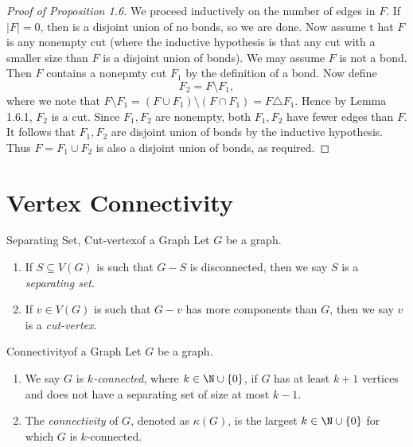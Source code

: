 \documentclass[co342]{subfiles}
\begin{document}
    \begin{proof}[Proof of Proposition 1.6]
        We proceed inductively on the number of edges in $F$. If $\left| F \right| = 0$, then is a disjoint union of no bonds, so we are done. Now assume t hat $F$ is any nonempty cut (where the inductive hypothesis is that any cut with a smaller size than $F$ is a disjoint union of bonds). We may assume $F$ is not a bond. Then $F$ contains a nonepmty cut $F_1$ by the definition of a bond. Now define
        \begin{equation*}
            F_2 = F\setminus F_1,
        \end{equation*}
        where we note that $F\setminus F_1 = \left( F\cup F_1 \right) \setminus \left( F\cap F_1 \right) = F\triangle F_1$. Hence by Lemma 1.6.1, $F_2$ is a cut. Since $F_1,F_2$ are nonempty, both $F_1,F_2$ have fewer edges than $F$. It follows that $F_1,F_2$ are disjoint union of bonds by the inductive hypothesis. Thus $F=F_1\cup F_2$ is also a disjoint union of bonds, as required.
    \end{proof}

    \section{Vertex Connectivity}
    
    \begin{definition}{Separating Set, Cut-vertex}{of a Graph}
        Let $G$ be a graph.
        \begin{enumerate}
            \item If $S\subseteq V\left( G \right)$ is such that $G-S$ is disconnected, then we say $S$ is a \emph{separating set}.
            \item If $v\in V\left( G \right)$ is such that $G-v$ has more components than $G$, then we say $v$ is a \emph{cut-vertex}.
        \end{enumerate}
    \end{definition}

    \begin{definition}{Connectivity}{of a Graph}
        Let $G$ be a graph. 
        \begin{enumerate}
            \item We say $G$ is \emph{$k$-connected}, where $k\in\N\cup\left\lbrace 0 \right\rbrace$, if $G$ has at least $k+1$ vertices and does not have a separating set of size at most $k-1$.
            \item The \emph{connectivity} of $G$, denoted as $\kappa\left( G \right)$, is the largest $k\in\N\cup\left\lbrace 0 \right\rbrace$ for which $G$ is $k$-connected.
        \end{enumerate}
    \end{definition}
\end{document}
